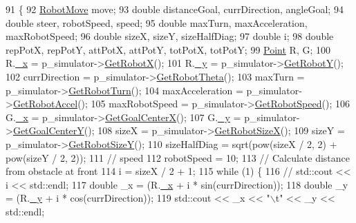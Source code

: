 \begin{DoxyCode}
91                                      \{
92   \hyperlink{structRobotMove}{RobotMove} move;
93   \textcolor{keywordtype}{double} distanceGoal, currDirection, angleGoal;
94   \textcolor{keywordtype}{double} steer, robotSpeed, speed;
95   \textcolor{keywordtype}{double} maxTurn, maxAcceleration, maxRobotSpeed;
96   \textcolor{keywordtype}{double} sizeX, sizeY, sizeHalfDiag;
97   \textcolor{keywordtype}{double} i;
98   \textcolor{keywordtype}{double} repPotX, repPotY, attPotX, attPotY, totPotX, totPotY;
99   \hyperlink{structPoint}{Point} R, G;
100   R.\hyperlink{structPoint_a77b9bd094b57efb7c185fdb3fb781900}{\_x} = p\_simulator->\hyperlink{classRobotSimulator_ac7bea18d767ec267142fbc72391ca89b}{GetRobotX}();
101   R.\hyperlink{structPoint_aa8be383c30dee092979999b523373658}{\_y} = p\_simulator->\hyperlink{classRobotSimulator_a83e9060cfd1bab860ae56c80697d6de0}{GetRobotY}();
102   currDirection = p\_simulator->\hyperlink{classRobotSimulator_ade2906f35ab46657323d354ba5c7ba50}{GetRobotTheta}();
103   maxTurn = p\_simulator->\hyperlink{classRobotSimulator_a3ca3ad525b38e5f0b2ee556916058775}{GetRobotTurn}();
104   maxAcceleration = p\_simulator->\hyperlink{classRobotSimulator_a05fd185adb07605ab99da82a07028fb9}{GetRobotAccel}();
105   maxRobotSpeed = p\_simulator->\hyperlink{classRobotSimulator_a660a5fac6b81c87528aba1d3f978b75f}{GetRobotSpeed}();
106   G.\hyperlink{structPoint_a77b9bd094b57efb7c185fdb3fb781900}{\_x} = p\_simulator->\hyperlink{classRobotSimulator_a7e26ec222d3524872e4e48f2188b385f}{GetGoalCenterX}();
107   G.\hyperlink{structPoint_aa8be383c30dee092979999b523373658}{\_y} = p\_simulator->\hyperlink{classRobotSimulator_a11ef47f5c24415d1ae2422de45969910}{GetGoalCenterY}();
108   sizeX  = p\_simulator->\hyperlink{classRobotSimulator_ace930a7f7cbef97b82c08629a3319b05}{GetRobotSizeX}();
109   sizeY = p\_simulator->\hyperlink{classRobotSimulator_ae2efdc2fbc4793f205b2f4c10d4a301d}{GetRobotSizeY}();
110   sizeHalfDiag = sqrt(pow(sizeX / 2, 2) + pow(sizeY / 2, 2));
111   \textcolor{comment}{//  speed}
112   robotSpeed = 10;
113   \textcolor{comment}{//  Calculate distance from obstacle at front}
114   i = sizeX / 2 + 1;
115   \textcolor{keywordflow}{while} (1) \{
116     \textcolor{comment}{//  std::cout << i << std::endl;}
117     \textcolor{keywordtype}{double} \_x = (R.\hyperlink{structPoint_a77b9bd094b57efb7c185fdb3fb781900}{\_x} + i * sin(currDirection));
118     \textcolor{keywordtype}{double} \_y = (R.\hyperlink{structPoint_aa8be383c30dee092979999b523373658}{\_y} + i * cos(currDirection));
119     std::cout << \_x << \textcolor{stringliteral}{"\(\backslash\)t"} << \_y << std::endl;

\end{DoxyCode}
